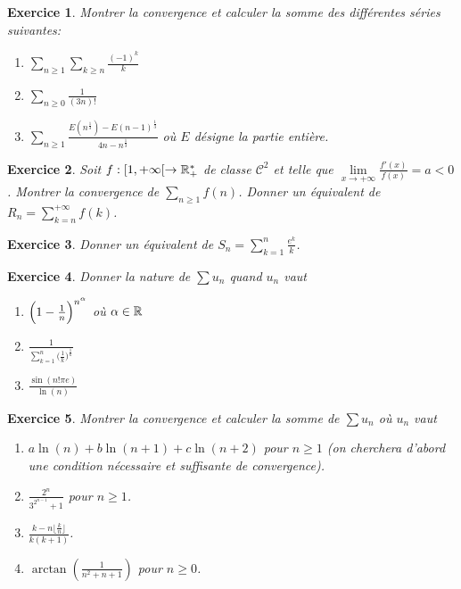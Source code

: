 \documentclass[12pt]{article}
\newtheorem{exercise}{Exercice}[section]
\theoremstyle{remark}
\theoremstyle{remark}
\begin{document}
\begin{exercise}
	Montrer la convergence et calculer la somme des différentes séries suivantes:
	\begin{enumerate}
		\item
		$\sum_{n\geqslant1}\sum_{k\geqslant n}\frac{(-1)^{k}}{k}$
		\item
		$\sum_{n\geqslant0}\frac{1}{(3n)!}$
		\item
		$\sum_{n\geqslant1}\frac{E(n^{\frac{1}{3}})-E(n-1)^{\frac{1}{3}}}{4n-n^{\frac{1}{3}}}$
		où $E$ désigne la partie entière.
	\end{enumerate}
\end{exercise}

\begin{exercise}
	Soit $f:[1,+\infty[\to\mathbb{R}_{+}^{*}$ de classe $\mathcal{C}^{2}$ et telle que
	$\lim\limits_{x\to+\infty}\frac{f'(x)}{f(x)}=a<0$. Montrer la convergence de
	$\sum_{n\geqslant1}f(n)$. Donner un équivalent de $R_{n}=\sum_{k=n}^{+\infty}
	f(k)$.
\end{exercise}

\begin{exercise}
	Donner un équivalent de $S_{n}=\sum_{k=1}^{n}\frac{e^{k}}{k}$.
\end{exercise}

\begin{exercise}
	Donner la nature de $\sum u_{n}$ quand $u_{n}$ vaut
	\begin{enumerate}
		\item
		$\Bigl(1-\frac{1}{n}\Bigr)^{n^{\alpha}}$ où $\alpha\in\mathbb{R}$
		\item
		$\frac{1}{\sum_{k=1}^{n}\bigl(\frac{1}{k}\bigr)^{\frac{1}{k}}}$
		\item
		$\frac{\sin(n!\pi e)}{\ln(n)}$
	\end{enumerate}
\end{exercise}

\begin{exercise}
	Montrer la convergence et calculer la somme de $\sum u_{n}$ où $u_{n}$ vaut
	\begin{enumerate}
		\item
		$a\ln(n)+b\ln(n+1)+c\ln(n+2)$ pour $n\geqslant1$ (on cherchera d'abord une
		condition nécessaire et suffisante de convergence).
		\item
		$\frac{2^{n}}{3^{2^{n-1}}+1}$ pour $n\geqslant 1$.
		\item
		$\frac{k-n\lfloor\frac{k}{n}\rfloor}{k(k+1)}$.
		\item
		$\arctan(\frac{1}{n^{2}+n+1})$ pour $n\geqslant0$.
	\end{enumerate}
\end{exercise}
\end{document}
